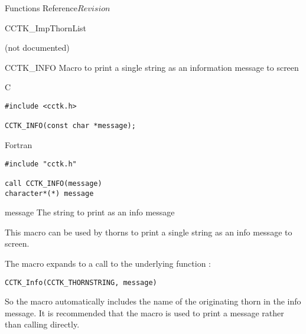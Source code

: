\begin{cactuspart}{ Functions Reference}{}{$Revision$}
\begin{FunctionDescription}{CCTK\_ImpThornList}
\begin{ErrorSection}
\begin{Error}{}
(not documented)
\end{Error}
\end{ErrorSection}

\end{FunctionDescription}



\begin{FunctionDescription}{CCTK\_INFO}
\label{CCTK-INFO}
Macro to print a single string as an information message to screen

\begin{SynopsisSection}
\begin{Synopsis}{C}
\begin{verbatim}
#include <cctk.h>

CCTK_INFO(const char *message);
\end{verbatim}
\end{Synopsis}
\begin{Synopsis}{Fortran}
\begin{verbatim}
#include "cctk.h"

call CCTK_INFO(message)
character*(*) message
\end{verbatim}
\end{Synopsis}
\end{SynopsisSection}

\begin{ParameterSection}
\begin{Parameter}{message}
The string to print as an info message
\end{Parameter}
\end{ParameterSection}

\begin{Discussion}
This macro can be used by thorns to print a single string as an info message
to screen.

The macro  expands to a call to the
underlying function :

\begin{verbatim}
CCTK_Info(CCTK_THORNSTRING, message)
\end{verbatim}

So the macro automatically includes the name of the originating thorn in the
info message. It is recommended that the macro  is used
to print a message rather than calling  directly.


\end{Discussion}
\end{FunctionDescription}
\end{cactuspart}
